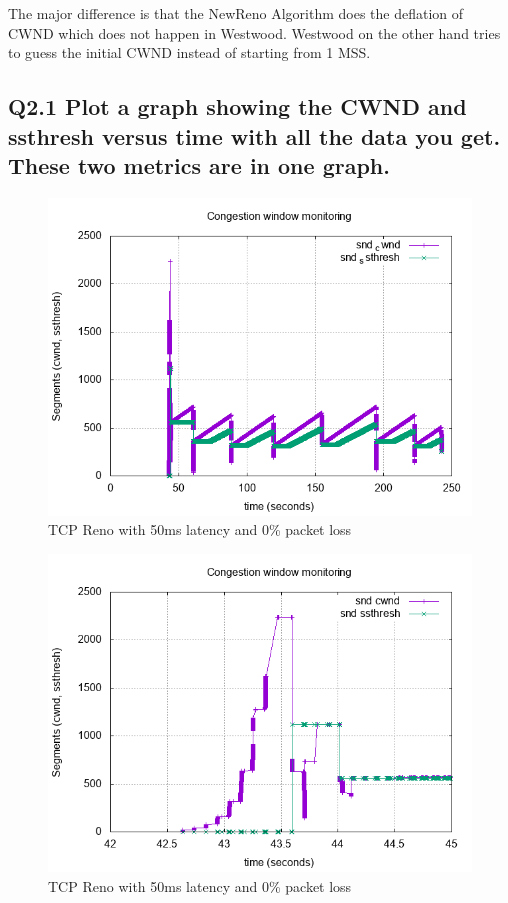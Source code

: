 \documentclass{article}
\begin{document}
The major difference is that the NewReno Algorithm does the deflation of CWND which does not happen in Westwood. Westwood on the other hand tries to guess the initial CWND instead of starting from 1 MSS.

\newpage

\subsection{Q2.1 Plot a graph showing the CWND and ssthresh versus time
with all the data you get. These two metrics are in one graph.}

\begin{figure}[h]
    \centering
    \includegraphics[scale=0.5]{images/lab1-group11-task2-question1.png}
    \caption{TCP Reno with 50ms latency and 0\% packet loss}
    \label{fig:lab1-group11-task2-question1}
\end{figure}

\begin{figure}[h!]
    \centering
    \includegraphics[scale=0.5]{images/lab1-group11-task2-question1-zoom.png}
    \caption{TCP Reno with 50ms latency and 0\% packet loss}
    \label{fig:lab1-group11-task2-question1-zoom}
\end{figure}
\end{document}
